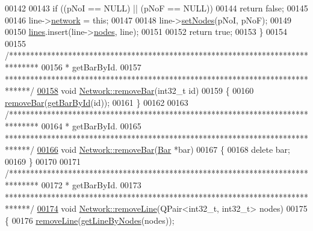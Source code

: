 \begin{DoxyCode}
00142 
00143   \textcolor{keywordflow}{if} ((pNoI == NULL) || (pNoF == NULL))
00144     \textcolor{keywordflow}{return} \textcolor{keyword}{false};
00145 
00146   line->\hyperlink{class_line_aefdf6a6c3e3775b5a16b344c1d33964e}{network} = \textcolor{keyword}{this};
00147 
00148   line->\hyperlink{group___models_gaeeab146e6c1d7d1a688a2764a9c9a170}{setNodes}(pNoI, pNoF);
00149 
00150   \hyperlink{class_network_acda0fd42e712e460a08a0e96511ee7eb}{lines}.insert(line->\hyperlink{class_line_afd17c40d656e6a8d677cb22df5f0c70b}{nodes}, line);
00151 
00152   \textcolor{keywordflow}{return} \textcolor{keyword}{true};
00153 \}
00154 
00155 \textcolor{comment}{/*******************************************************************************}
00156 \textcolor{comment}{ * getBarById.}
00157 \textcolor{comment}{ ******************************************************************************/}
\hypertarget{network_8cpp_source_l00158}{}\hyperlink{group___graphics_ga997ce4f03d316b9f138f2e64e6ca400c}{00158} \textcolor{keywordtype}{void} \hyperlink{group___graphics_ga997ce4f03d316b9f138f2e64e6ca400c}{Network::removeBar}(int32\_t \textcolor{keywordtype}{id})
00159 \{
00160   \hyperlink{group___graphics_ga997ce4f03d316b9f138f2e64e6ca400c}{removeBar}(\hyperlink{group___graphics_ga04d524ce0fa0dd0d06deda92b1597af0}{getBarById}(\textcolor{keywordtype}{id}));
00161 \}
00162 
00163 \textcolor{comment}{/*******************************************************************************}
00164 \textcolor{comment}{ * getBarById.}
00165 \textcolor{comment}{ ******************************************************************************/}
\hypertarget{network_8cpp_source_l00166}{}\hyperlink{group___graphics_ga7dea7690987c58fa61ffaa0326b68b68}{00166} \textcolor{keywordtype}{void} \hyperlink{group___graphics_ga997ce4f03d316b9f138f2e64e6ca400c}{Network::removeBar}(\hyperlink{class_bar}{Bar} *bar)
00167 \{
00168   \textcolor{keyword}{delete} bar;
00169 \}
00170 
00171 \textcolor{comment}{/*******************************************************************************}
00172 \textcolor{comment}{ * getBarById.}
00173 \textcolor{comment}{ ******************************************************************************/}
\hypertarget{network_8cpp_source_l00174}{}\hyperlink{group___graphics_ga1eef3317224a7a06348fce07e581a9ad}{00174} \textcolor{keywordtype}{void} \hyperlink{group___graphics_ga1eef3317224a7a06348fce07e581a9ad}{Network::removeLine}(QPair<int32\_t, int32\_t> nodes)
00175 \{
00176   \hyperlink{group___graphics_ga1eef3317224a7a06348fce07e581a9ad}{removeLine}(\hyperlink{group___graphics_ga8f090b85a7779695cb9f05b6395b3044}{getLineByNodes}(nodes));

\end{DoxyCode}
